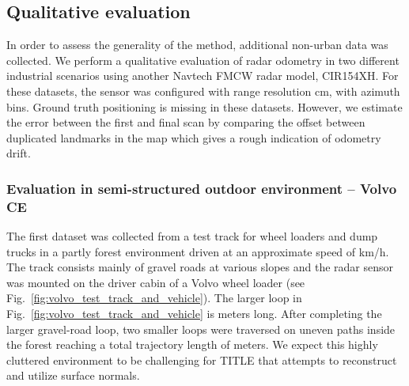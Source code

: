 











\subsection{Qualitative evaluation}
In order to assess the generality of the method, additional non-urban  data was collected. We perform a qualitative evaluation of radar odometry in two different industrial scenarios using 
another Navtech \ac{FMCW} radar model,
CIR154XH. 
For these datasets, the sensor was configured with range resolution cm, with  azimuth bins. Ground truth positioning is missing in these datasets. However, we estimate the error between the first and final scan by comparing the offset between duplicated landmarks in the map which gives a rough indication of odometry drift.


\subsubsection{Evaluation in semi-structured outdoor environment -- Volvo CE}
\label{sec:volvo_eval}

The first dataset was collected from a test track for wheel loaders and dump trucks in a partly forest environment driven at an approximate speed of km/h. The track consists mainly of gravel roads at various slopes and the radar sensor was mounted on the driver cabin of a Volvo wheel loader (see Fig.~\ref{fig:volvo_test_track_and_vehicle}). The larger loop in Fig.~\ref{fig:volvo_test_track_and_vehicle} is  meters long. After completing the larger gravel-road loop, two smaller loops were traversed on uneven paths inside the forest reaching a total trajectory length of  meters. We expect this highly cluttered environment to be challenging for \ac{TITLE} that attempts to reconstruct and utilize surface normals.








